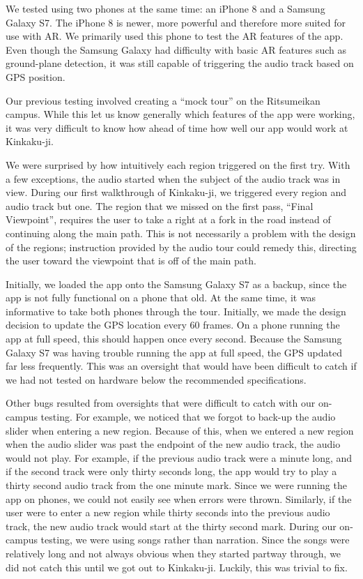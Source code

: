 \documentclass[a4paper, 10pt, american, titlepage]{article}
\begin{document}
We tested using two phones at the same time: an iPhone 8 and a Samsung Galaxy
S7. The iPhone 8 is newer, more powerful and therefore more suited for use with
AR. We primarily used this phone to test the AR features of the app. Even
though the Samsung Galaxy had difficulty with basic AR features such as
ground-plane detection, it was still capable of triggering the audio track
based on GPS position.

Our previous testing involved creating a ``mock tour'' on the Ritsumeikan
campus. While this let us know generally which features of the app were working,
it was very difficult to know how ahead of time how well our app would work at
Kinkaku-ji.

We were surprised by how intuitively each region triggered on the first try.
With a few exceptions, the audio started when the subject of the audio track
was in view. During our first walkthrough of Kinkaku-ji, we triggered every
region and audio track but one. The region that we missed on the first pass,
``Final Viewpoint'', requires the user to take a right at a fork in the road
instead of continuing along the main path. This is not necessarily a problem
with the design of the regions; instruction provided by the audio tour could
remedy this, directing the user toward the viewpoint that is off of the main
path.

Initially, we loaded the app onto the Samsung Galaxy S7 as a backup, since the
app is not fully functional on a phone that old. At the same time, it was
informative to take both phones through the tour. Initially, we made the design
decision to update the GPS location every 60 frames. On a phone running the app
at full speed, this should happen once every second. Because the Samsung Galaxy
S7 was having trouble running the app at full speed, the GPS updated far less
frequently. This was an oversight that would have been difficult to catch if we
had not tested on hardware below the recommended specifications.

Other bugs resulted from oversights that were difficult to catch with our
on-campus testing.  For example, we noticed that we forgot to back-up the audio
slider when entering a new region.  Because of this, when we entered a new
region when the audio slider was past the endpoint of the new audio track, the
audio would not play. For example, if the previous audio track were a minute
long, and if the second track were only thirty seconds long, the app would try
to play a thirty second audio track from the one minute mark. Since we were
running the app on phones, we could not easily see when errors were thrown.
Similarly, if the user were to enter a new region while thirty seconds into the
previous audio track, the new audio track would start at the thirty second
mark. During our on-campus testing, we were using songs rather than narration.
Since the songs were relatively long and not always obvious when they started
partway through, we did not catch this until we got out to Kinkaku-ji. Luckily,
this was trivial to fix.
\end{document}
